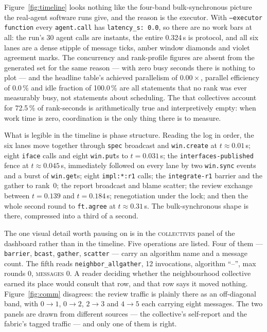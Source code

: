 \documentclass[11pt]{article}
\begin{document}
Figure~\ref{fig:timeline} looks nothing like the four-band bulk-synchronous picture the
real-agent software runs give, and the reason is the executor. With \texttt{--executor
function} every \texttt{agent.call} has \texttt{latency\_s: 0.0}, so there are no work bars at
all: the run's 30 agent calls are instants, the entire 0.324\,s is protocol, and all six lanes
are a dense stipple of message ticks, amber window diamonds and violet agreement marks. The
concurrency and rank-profile figures are absent from the generated set for the same reason ---
with zero busy seconds there is nothing to plot --- and the headline table's achieved
parallelism of $0.00\times$, parallel efficiency of 0.0\,\% and idle fraction of 100.0\,\% are
all statements that no rank was ever measurably busy, not statements about scheduling. The
 that collectives account for 72.5\,\% of rank-seconds is arithmetically true
and interpretively empty: when work time is zero, coordination is the only thing there is to
measure.

What is legible in the timeline is phase structure. Reading the log in order, the six lanes
move together through \texttt{spec} broadcast and \texttt{win.create} at $t \approx 0.01$\,s;
eight \texttt{iface} calls and eight \texttt{win.put}s to $t = 0.031$\,s; the
\texttt{interfaces-published} fence at $t \approx 0.045$\,s, immediately followed on every
lane by two \texttt{win.sync} events and a burst of \texttt{win.get}s; eight
\texttt{impl:*:r1} calls; the \texttt{integrate-r1} barrier and the gather to rank~0; the
report broadcast and blame scatter; the review exchange between $t = 0.139$ and $t = 0.184$\,s;
renegotiation under the lock; and then the whole second round to \texttt{ft.agree} at
$t \approx 0.31$\,s. The bulk-synchronous shape is there, compressed into a third of a second.

The one visual detail worth pausing on is in the \textsc{collectives} panel of the dashboard
rather than in the timeline. Five operations are listed. Four of them ---
\texttt{barrier}, \texttt{bcast}, \texttt{gather}, \texttt{scatter} --- carry an algorithm name
and a message count. The fifth reads \texttt{neighbor\_allgather}, 12 invocations, algorithm
``--'', max rounds 0, \textsc{messages} 0. A reader deciding whether the neighbourhood
collective earned its place would consult that row, and that row says it moved nothing.
Figure~\ref{fig:comm} disagrees: the review traffic is plainly there as an off-diagonal band,
with $0 \rightarrow 1$, $0 \rightarrow 2$, $2 \rightarrow 3$ and $4 \rightarrow 5$ each
carrying eight messages. The two panels are drawn from different sources --- the collective's
self-report and the fabric's tagged traffic --- and only one of them is right.
\end{document}
